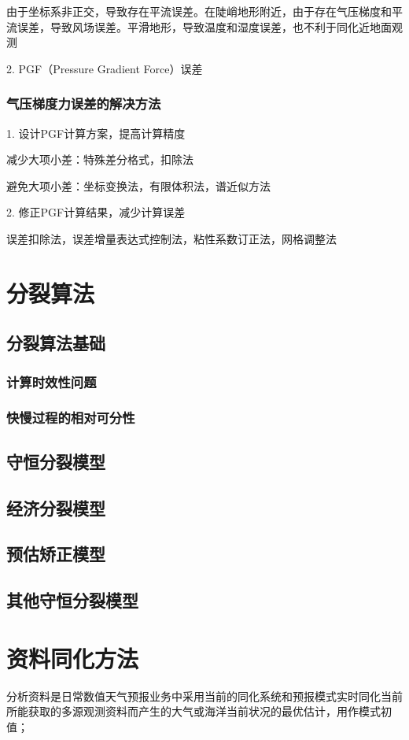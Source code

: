 \documentclass{article}
\begin{document}
由于坐标系非正交，导致存在平流误差。在陡峭地形附近，由于存在气压梯度和平流误差，导致风场误差。平滑地形，导致温度和湿度误差，也不利于同化近地面观测

2. PGF（Pressure Gradient Force）误差

\subsubsection{气压梯度力误差的解决方法}
1. 设计PGF计算方案，提高计算精度

减少大项小差：特殊差分格式，扣除法

避免大项小差：坐标变换法，有限体积法，谱近似方法

2. 修正PGF计算结果，减少计算误差

误差扣除法，误差增量表达式控制法，粘性系数订正法，网格调整法

\newpage
\section{分裂算法}
\subsection{分裂算法基础}
\subsubsection{计算时效性问题}
\subsubsection{快慢过程的相对可分性}
\subsection{守恒分裂模型}
\subsection{经济分裂模型}
\subsection{预估矫正模型}
\subsection{其他守恒分裂模型}
\newpage
\section{资料同化方法}
分析资料是日常数值天气预报业务中采用当前的同化系统和预报模式实时同化当前所能获取的多源观测资料而产生的大气或海洋当前状况的最优估计，用作模式初值；
\end{document}
